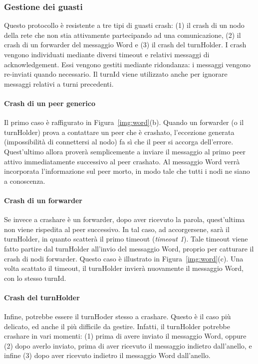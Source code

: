 \documentclass[9pt]{article}
\begin{document}
\subsubsection*{Gestione dei guasti}
Questo protocollo è resistente a tre tipi di guasti crash: (1) il crash di un nodo della rete che non stia attivamente partecipando ad una comunicazione, (2) il crash di un forwarder del messaggio Word e (3) il crash del turnHolder. I crash vengono individuati mediante diversi timeout e relativi messaggi di acknowledgement. Essi vengono gestiti mediante ridondanza: i messaggi vengono re-inviati quando necessario. Il turnId viene utilizzato anche per ignorare messaggi relativi a turni precedenti.

\paragraph{Crash di un peer generico}
Il primo caso è raffigurato in Figura~\ref{img:word}(b). Quando un forwarder (o il turnHolder) prova a contattare un peer che è crashato, l'eccezione generata (impossibilità di connettersi al nodo) fa sì che il peer si accorga dell'errore. Quest'ultimo allora proverà semplicemente a inviare il messaggio al primo peer attivo immediatamente successivo al peer crashato. Al messaggio Word verrà incorporata l'informazione sul peer morto, in modo tale che tutti i nodi ne siano a conoscenza.

\paragraph{Crash di un forwarder}
Se invece a crashare è un forwarder, dopo aver ricevuto la parola, quest'ultima non viene rispedita al peer successivo. In tal caso, ad accorgersene, sarà il turnHolder, in quanto scatterà il primo timeout (\emph{timeout 1}). Tale timeout viene fatto partire dal turnHolder all'invio del messaggio Word, proprio per catturare il crash di nodi forwarder. Questo caso è illustrato in Figura~\ref{img:word}(c). Una volta scattato il timeout, il turnHolder invierà nuovamente il messaggio Word, con lo stesso turnId.

\paragraph{Crash del turnHolder}
Infine, potrebbe essere il turnHoder stesso a crashare. Questo è il caso più delicato, ed anche il più difficile da gestire. Infatti, il turnHolder potrebbe crashare in vari momenti: (1) prima di avere inviato il messaggio Word, oppure (2) dopo averlo inviato, prima di aver ricevuto il messaggio indietro dall'anello, e infine (3) dopo aver ricevuto indietro il messaggio Word dall'anello.
\end{document}
